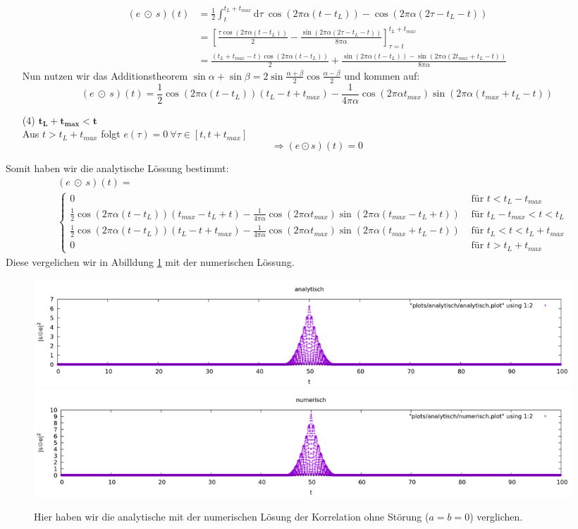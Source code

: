 \documentclass[ngerman]{scrartcl}
\begin{document}
\begin{itemize}
	\begin{align*}
		(e ~\odot~ s)(t)&=\frac{1}{2}\int_{t}^{t_L+t_{max}} \mathrm{d} \tau~ \cos(2\pi\alpha(t-t_L))-\cos(2\pi\alpha(2\tau-t_L-t))\\
		&=\left[\frac{\tau\cos(2\pi\alpha(t-t_L))}{2}-\frac{\sin(2\pi\alpha(2\tau-t_L-t))}{8\pi\alpha}\right]_{\tau=t}^{t_L+t_{max}}\\
		&=\frac{(t_L+t_{max}-t)\cos(2\pi\alpha(t-t_L))}{2}+\frac{\sin(2\pi\alpha(t-t_L))-\sin(2\pi\alpha(2t_{max}+t_L-t))}{8\pi\alpha}
	\end{align*}
	Nun nutzen wir das Additionstheorem $\sin \alpha +\sin \beta = 2 \sin \frac{\alpha + \beta}{2} \cos \frac{\alpha - \beta}{2}$ und kommen auf:
	\begin{equation*}
		(e ~\odot~ s)(t)=\frac{1}{2}\cos(2\pi\alpha(t-t_L))(t_L-t+t_{max})-\frac{1}{4\pi\alpha}\cos(2\pi\alpha t_{max})\sin(2\pi\alpha(t_{max}+t_L-t))
	\end{equation*}
	\item [(4)] {$\mathbf{t_L+t_{max}<t}$}\\
	Aus $t>t_L+t_{max}$ folgt $e(\tau)=0~\forall\tau\in[t,t+t_{max}]$
	\begin{equation*}
		\Rightarrow(e \odot s)(t)=0
	\end{equation*}
\end{itemize}
Somit haben wir die analytische L\"ossung bestimmt:
\begin{align*}
	&(e ~\odot~ s)(t)=\\
	&\left\{\begin{array}{ll}
	0 & \text { für } t<t_L-t_{max}\\
	\frac{1}{2}\cos(2\pi\alpha(t-t_L))(t_{max}-t_L+t)-\frac{1}{4\pi\alpha}\cos(2\pi\alpha t_{max})\sin(2\pi\alpha(t_{max}-t_L+t))
	& \text { für } t_L-t_{max}<t<t_L\\
	\frac{1}{2}\cos(2\pi\alpha(t-t_L))(t_L-t+t_{max})-\frac{1}{4\pi\alpha}\cos(2\pi\alpha t_{max})\sin(2\pi\alpha(t_{max}+t_L-t))
	& \text { für } t_L<t<t_L+t_{max}\\
	0 & \text { für } t>t_L+t_{max}
	\end{array}\right.
\end{align*}
Diese vergelichen wir in Abilldung \ref{fig:4.1} mit der numerischen L\"ossung.
\begin{figure}[htbp]
	\centering
	\includegraphics[width=0.98\textwidth]{plots/analytisch/analytisch.png}
	\includegraphics[width=0.98\textwidth]{plots/analytisch/numerisch.png}
	\caption[Vergleich]{Hier haben wir die analytische mit der numerischen Lösung der Korrelation ohne Störung ($a=b=0$) verglichen.}
	\label{fig:4.1}
\end{figure} 
\end{document}
